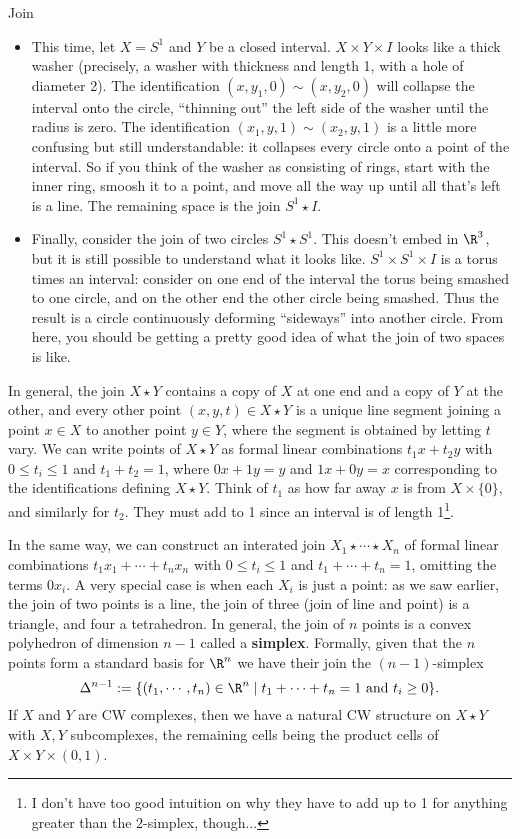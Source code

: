 \begin{namedthing}{Join}
\begin{itemize}
        \item This time, let $X=S^1 $ and $Y$ be a closed interval. $X\times Y\times I$ looks like a thick washer (precisely, a washer with thickness and length 1, with a hole of diameter 2). The identification $(x,y_1,0)\sim(x,y_2,0)$ will collapse the interval onto the circle, ``thinning out'' the left side of the washer until the radius is zero. The identification $(x_1,y,1)\sim(x_2,y,1)$ is a little more confusing but still understandable: it collapses every circle onto a point of the interval. So if you think of the washer as consisting of rings, start with the inner ring, smoosh it to a point, and move all the way up until all that's left is a line. The remaining space is the join $S^1 \star I$.
        \item Finally, consider the join of two circles $S^1 \star S^1 $. This doesn't embed in $\R^3$, but it is still possible to understand what it looks like. $S^1 \times S^1 \times I$ is a torus times an interval: consider on one end of the interval the torus being smashed to one circle, and on the other end the other circle being smashed. Thus the result is a circle continuously deforming ``sideways'' into another circle. From here, you should be getting a pretty good idea of what the join of two spaces is like.
    \end{itemize}
    In general, the join $X\star Y$ contains a copy of $X$ at one end and a copy of $Y$ at the other, and every other point $(x,y,t)\in X\star Y$ is a unique line segment joining a point $x\in X$ to another point $y\in Y$, where the segment is obtained by letting $t$ vary. We can write points of $X\star Y$ as formal linear combinations $t_1x+t_2y$ with $0\leq t_i  \leq 1$ and $t_1+t_2=1$, where $0x+1y=y$ and $1x+0y=x$ corresponding to the identifications defining $X\star Y$. Think of $t_1$ as how far away $x$ is from $X\times \{0\} $, and similarly for $t_2$. They must add to 1 since an interval is of length 1\footnote{I don't have too good intuition on why they have to add up to 1 for anything greater than the $2$-simplex, though...}.

    In the same way, we can construct an interated join $X_1\star \cdots \star X_n $ of formal linear combinations $t_1x_1+\cdots +t_n x_n $ with $0\leq t_i \leq 1$ and $t_1+\cdots +t_n =1$, omitting the terms $0x_i $. A very special case is when each $X_i $ is just a point: as we saw earlier, the join of two points is a line, the join of three (join of line and point) is a triangle, and four a tetrahedron. In general, the join of $n$ points is a convex polyhedron of dimension $n-1$ called a \textbf{simplex}. Formally, given that the $n$ points form a standard basis for $\R^n $ we have their join the $(n-1)$-simplex \[
        \Delta ^{n-1}:=\{(t_1,\cdots ,t_n )\in \R^n  \mid t_1+\cdots +t_n =1 \ \text{and} \ t_i \geq 0\} .
    \] If $X$ and $Y$ are CW complexes, then we have a natural CW structure on $X\star Y$ with $X,Y$ subcomplexes, the remaining cells being the product cells of $X\times Y\times (0,1)$.
\end{namedthing}
